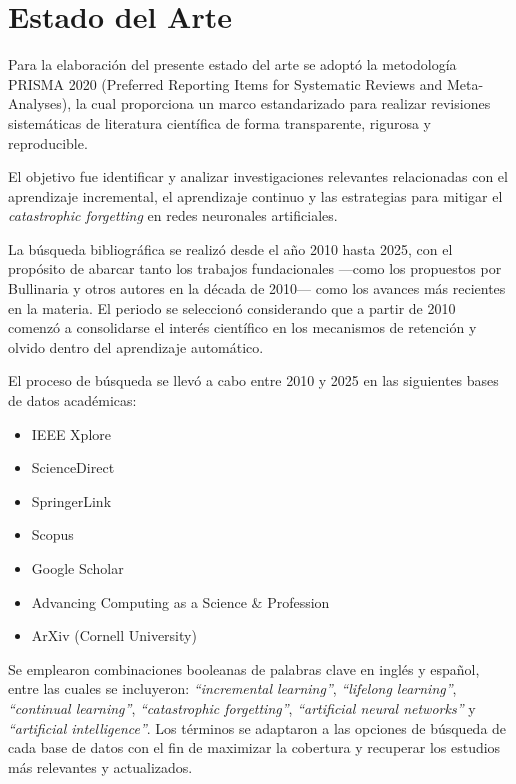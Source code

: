 \documentclass[10pt,a4paper]{article}
\begin{document}
\section{Estado del Arte}

Para la elaboración del presente estado del arte se adoptó la metodología PRISMA 2020 (Preferred Reporting Items for Systematic Reviews and Meta-Analyses), la cual proporciona un marco estandarizado para realizar revisiones sistemáticas de literatura científica de forma transparente, rigurosa y reproducible.  

El objetivo fue identificar y analizar investigaciones relevantes relacionadas con el aprendizaje incremental, el aprendizaje continuo y las estrategias para mitigar el \textit{catastrophic forgetting} en redes neuronales artificiales.  

La búsqueda bibliográfica se realizó desde el año 2010 hasta 2025, con el propósito de abarcar tanto los trabajos fundacionales —como los propuestos por Bullinaria y otros autores en la década de 2010— como los avances más recientes en la materia.  
El periodo se seleccionó considerando que a partir de 2010 comenzó a consolidarse el interés científico en los mecanismos de retención y olvido dentro del aprendizaje automático.  

El proceso de búsqueda se llevó a cabo entre 2010 y 2025 en las siguientes bases de datos académicas:
\begin{itemize}
    \item IEEE Xplore
    \item ScienceDirect
    \item SpringerLink
    \item Scopus
    \item Google Scholar
    \item Advancing Computing as a Science \& Profession
    \item ArXiv (Cornell University)
\end{itemize}

Se emplearon combinaciones booleanas de palabras clave en inglés y español, entre las cuales se incluyeron: 
\textit{``incremental learning''}, \textit{``lifelong learning''}, \textit{``continual learning''}, \textit{``catastrophic forgetting''}, \textit{``artificial neural networks''} y \textit{``artificial intelligence''}.  
Los términos se adaptaron a las opciones de búsqueda de cada base de datos con el fin de maximizar la cobertura y recuperar los estudios más relevantes y actualizados.
\end{document}
